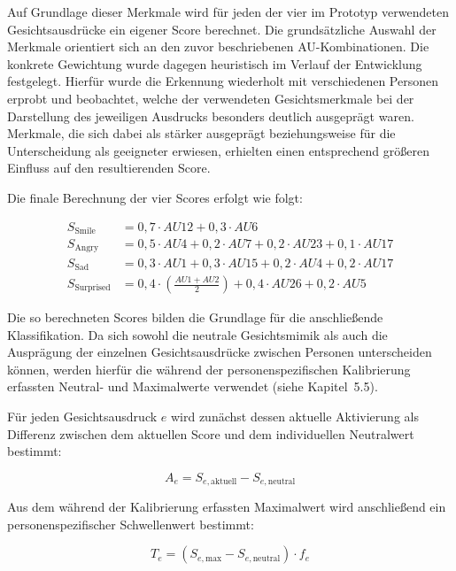 \documentclass[intern]{cgMA}
\begin{document}
Auf Grundlage dieser Merkmale wird für jeden der vier im Prototyp
verwendeten Gesichtsausdrücke ein eigener Score berechnet. Die
grundsätzliche Auswahl der Merkmale orientiert sich an den zuvor
beschriebenen AU-Kombinationen. Die konkrete Gewichtung wurde dagegen
heuristisch im Verlauf der Entwicklung festgelegt. Hierfür wurde die
Erkennung wiederholt mit verschiedenen Personen erprobt und beobachtet,
welche der verwendeten Gesichtsmerkmale bei der Darstellung des
jeweiligen Ausdrucks besonders deutlich ausgeprägt waren. Merkmale,
die sich dabei als stärker ausgeprägt beziehungsweise für die
Unterscheidung als geeigneter erwiesen, erhielten einen entsprechend
größeren Einfluss auf den resultierenden Score.

Die finale Berechnung der vier Scores erfolgt wie folgt:

\begin{align}
S_{\text{Smile}} &=
0{,}7 \cdot AU12 +
0{,}3 \cdot AU6
\\[0.5em]
S_{\text{Angry}} &=
0{,}5 \cdot AU4 +
0{,}2 \cdot AU7 +
0{,}2 \cdot AU23 +
0{,}1 \cdot AU17
\\[0.5em]
S_{\text{Sad}} &=
0{,}3 \cdot AU1 +
0{,}3 \cdot AU15 +
0{,}2 \cdot AU4 +
0{,}2 \cdot AU17
\\[0.5em]
S_{\text{Surprised}} &=
0{,}4 \cdot
\left(\frac{AU1 + AU2}{2}\right)
+
0{,}4 \cdot AU26 +
0{,}2 \cdot AU5
\end{align}

Die so berechneten Scores bilden die Grundlage für die anschließende
Klassifikation. Da sich sowohl die neutrale Gesichtsmimik als auch die
Ausprägung der einzelnen Gesichtsausdrücke zwischen Personen
unterscheiden können, werden hierfür die während der
personenspezifischen Kalibrierung erfassten Neutral- und Maximalwerte
verwendet (siehe Kapitel~5.5).

Für jeden Gesichtsausdruck $e$ wird zunächst dessen aktuelle Aktivierung
als Differenz zwischen dem aktuellen Score und dem individuellen
Neutralwert bestimmt:

\begin{equation}
    A_e =
    S_{e,\text{aktuell}} -
    S_{e,\text{neutral}}
\end{equation}

Aus dem während der Kalibrierung erfassten Maximalwert wird anschließend
ein personenspezifischer Schwellenwert bestimmt:

\begin{equation}
    T_e =
    \left(
        S_{e,\text{max}} -
        S_{e,\text{neutral}}
    \right)
    \cdot f_e
\end{equation}
\end{document}
